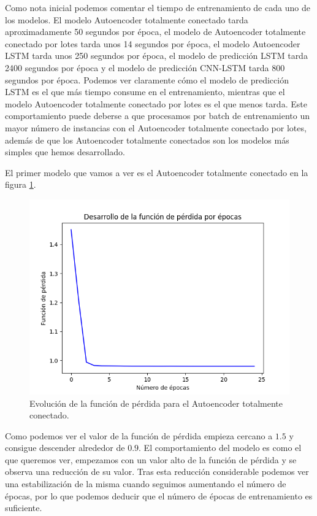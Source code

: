 Como nota inicial podemos comentar el tiempo de entrenamiento de cada uno de los modelos. El modelo Autoencoder totalmente conectado tarda aproximadamente 50 segundos por época, el modelo de Autoencoder totalmente conectado por lotes tarda unos 14 segundos por época, el modelo Autoencoder LSTM tarda unos 250 segundos por época, el modelo de predicción LSTM tarda 2400 segundos por época y el modelo de predicción CNN-LSTM tarda 800 segundos por época. Podemos ver claramente cómo el modelo de predicción LSTM es el que más tiempo consume en el entrenamiento, mientras que el modelo Autoencoder totalmente conectado por lotes es el que menos tarda. Este comportamiento puede deberse a que procesamos por batch de entrenamiento un mayor número de instancias con el Autoencoder totalmente conectado por lotes, además de que los Autoencoder totalmente conectados son los modelos más simples que hemos desarrollado.

El primer modelo que vamos a ver es el Autoencoder totalmente conectado en la figura \ref{img:loss-autoencoder-fully-connected}.
\begin{figure}[]
	\centering
	\includegraphics[scale=0.75]{imagenes/loss_autoencoder_fully_connected.png}
	\caption{Evolución de la función de pérdida para el Autoencoder totalmente conectado.}
	\label{img:loss-autoencoder-fully-connected}
\end{figure}

Como podemos ver el valor de la función de pérdida empieza cercano a $1.5$ y consigue descender alrededor de $0.9$. El comportamiento del modelo es como el que queremos ver, empezamos con un valor alto de la función de pérdida y se observa una reducción de su valor. Tras esta reducción considerable podemos ver una estabilización de la misma cuando seguimos aumentando el número de épocas, por lo que podemos deducir que el número de épocas de entrenamiento es suficiente.

